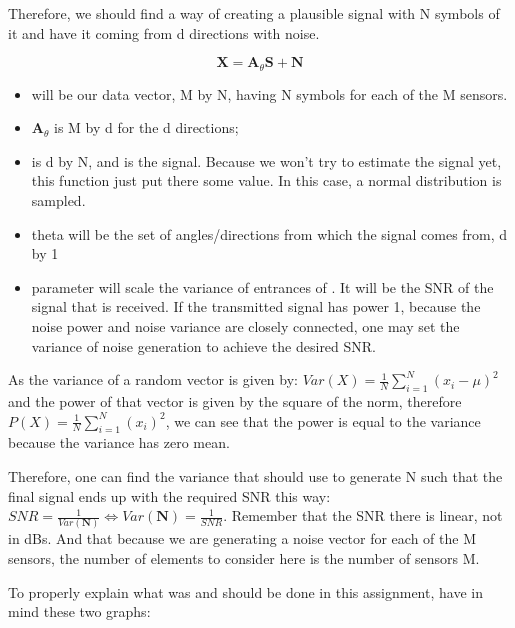 \documentclass[12pt, a4paper]{article}
\begin{document}

\vspace{1cm}

\par Therefore, we should find a way of creating a plausible signal with N symbols of it and have it coming from d directions with noise.

\begin{equation}
    \mathbf{X} = \mathbf{A}_\theta \mathbf{S} + \mathbf{N}
\end{equation}

\begin{itemize}
    \item {} will be our data vector, M by N, having N symbols for each of the M sensors.
    \item $\mathbf{A}_\theta$ is M by d for the d directions;
    \item {} is d by N, and is the signal. Because we won't try to estimate the signal yet, this function just put there some value. In this case, a normal distribution is sampled.
    \item theta will be the set of angles/directions from which the signal comes from, d by 1
    \item {} parameter will scale the variance of entrances of . It will be the SNR of the signal that is received. If the transmitted signal has power 1, because the noise power and noise variance are closely connected, one may set the variance of noise generation to achieve the desired SNR.
\end{itemize}

\par As the variance of a random vector is given by: $Var(X) = \frac{1}{N} \sum^N_{i=1} (x_i - \mu)^2$ and the power of that vector is given by the square of the norm, therefore $P(X) = \frac{1}{N} \sum^N_{i = 1}(x_i)^2$, we can see that the power is equal to the variance because the variance has zero mean.
\par Therefore, one can find the variance that should use to generate N such that the final signal ends up with the required SNR this way: $SNR = \frac{1}{Var(\mathbf{N})} \Leftrightarrow Var(\mathbf{N}) = \frac{1}{SNR}$. Remember that the SNR there is linear, not in dBs.
And that because we are generating a noise vector for each of the M sensors, the number of elements to consider here is the number of sensors M.

\par To properly explain what was and should be done in this assignment, have in mind these two graphs:
\end{document}
